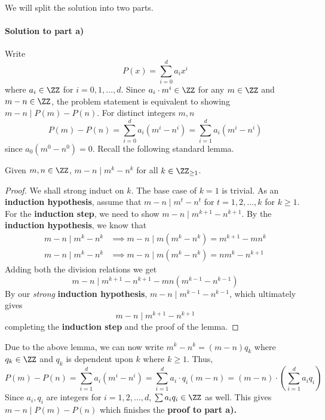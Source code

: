 \documentclass[numbers=endperiod, 11pt]{scrartcl}
\begin{document}
\begin{sol}
    We will split the solution into two parts.

    \paragraph{Solution to part a)} Write
    \[ P(x) = \sum_{i = 0}^d a_i x^i \]
    where $a_i \in \ZZ$ for $i = 0,1,\dots, d$. Since
    $a_i\cdot m^i \in \ZZ$ for any $m \in \ZZ$ and
    $m - n \in \ZZ$, the problem statement is equivalent
    to showing $m-n \mid P(m) - P(n)$. For distinct
    integers $m,n$
    \[P(m) - P(n) = \sum_{i = 0}^d a_i(m^i - n^i) = \sum_{i = 1}^d a_i(m^i - n^i) \]
    since $a_0(m^0 - n^0) = 0$. Recall the following
    standard lemma.
    \begin{lemma*}
        Given $m,n \in \ZZ$, $m - n \mid m^k - n^k$ for
        all $k \in \ZZ_{\ge 1}$.
    \end{lemma*}
    \begin{proof}
        We shall strong induct on $k$. The base case of
        $k = 1$ is trivial. As an
        \textbf{induction hypothesis}, assume that
        $m-n \mid m^t - n^t$ for $t = 1,2,\dots, k$ for
        $k \ge 1$. For the \textbf{induction step}, we need
        to show $m - n \mid m^{k + 1} - n^{k + 1}$. By the
        \textbf{induction hypothesis}, we know that
        \begin{align*}
            m - n \mid m^k - n^k & \implies m - n \mid m(m^k - n^k) = m^{k+1} -mn^k \\
            m - n \mid m^k - n^k & \implies m - n \mid m(m^k - n^k) = nm^k -n^{k+1}
        \end{align*}
        Adding both the division relations we get
        \[m - n \mid m^{k+1} - n^{k+1} -mn(m^{k-1} - n^{k-1}) \]
        By our \emph{strong} \textbf{induction hypothesis},
        $m - n \mid m^{k-1} - n^{k-1}$, which ultimately
        gives
        \[ m - n \mid m^{k+1} - n^{k+1} \]
        completing the \textbf{induction step} and the
        proof of the lemma.
    \end{proof}

    Due to the above lemma, we can now write
    $m^k - n^k = (m-n)q_k$ where $q_k \in \ZZ$ and $q_k$ is
    dependent upon $k$ where $k \ge 1$. Thus,
    \[P(m) - P(n) = \sum_{i = 1}^d a_i(m^i - n^i) = \sum_{i = 1}^d a_i\cdot q_i(m-n) = (m-n)\cdot \left(\sum_{i = 1}^d a_iq_i\right) \]
    Since $a_i,q_i$ are integers for $i = 1,2,\dots, d$,
    $\sum a_iq_i \in \ZZ$ as well. This gives
    $m - n \mid P(m) - P(n)$ which finishes the
    \textbf{proof to part a).} \bsquare

\end{sol}
\end{document}
